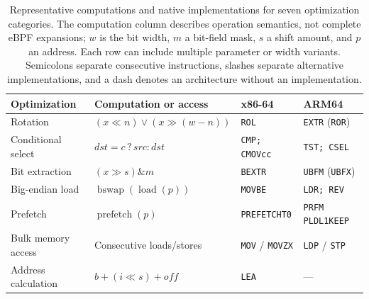 \begin{table}[t]
\centering
\small
\caption{Representative computations and native implementations for seven optimization categories. The computation column describes operation semantics, not complete eBPF expansions; $w$ is the bit width, $m$ a bit-field mask, $s$ a shift amount, and $p$ an address. Each row can include multiple parameter or width variants. Semicolons separate consecutive instructions, slashes separate alternative implementations, and a dash denotes an architecture without an implementation.}
\label{tab:descriptors}
\setlength{\tabcolsep}{5pt}
\renewcommand{\arraystretch}{1.12}
\begin{tabular*}{\textwidth}{@{\extracolsep{\fill}}llll@{}}
\toprule
\textbf{Optimization} & \textbf{Computation or access} & \textbf{x86-64} & \textbf{ARM64} \\
\midrule
Rotation & $(x\ll n)\lor(x\gg(w-n))$ & \texttt{ROL} & \texttt{EXTR} (\texttt{ROR}) \\
Conditional select & $dst=c\,?\,src:dst$ & \texttt{CMP; CMOVcc} & \texttt{TST; CSEL} \\
Bit extraction & $(x\gg s)\mathbin{\&}m$ & \texttt{BEXTR} & \texttt{UBFM} (\texttt{UBFX}) \\
Big-endian load & $\operatorname{bswap}(\operatorname{load}(p))$ & \texttt{MOVBE} & \texttt{LDR; REV} \\
Prefetch & $\operatorname{prefetch}(p)$ & \texttt{PREFETCHT0} & \texttt{PRFM PLDL1KEEP} \\
Bulk memory access & Consecutive loads/stores & \texttt{MOV} / \texttt{MOVZX} & \texttt{LDP} / \texttt{STP} \\
Address calculation & $b+(i\ll s)+off$ & \texttt{LEA} & --- \\
\bottomrule
\end{tabular*}
\end{table}
